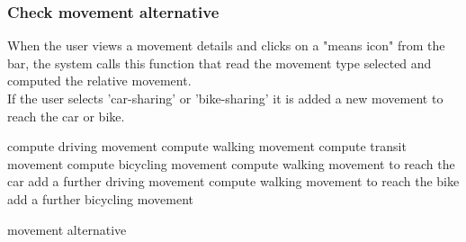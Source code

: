 \subsubsection{Check movement alternative}
When the user views a movement details and clicks on a "means icon" from the bar, the system calls this function that read the movement type selected and computed the relative movement.	
\\ If the user selects 'car-sharing' or 'bike-sharing' it is added a new movement to reach the car or bike.

\begin{algorithmic}
			\State compute driving movement
			\State compute walking movement
			\State compute transit movement
			\State compute bicycling movement
			\State compute walking movement to reach the car
			\State add a further driving movement
			\State compute walking movement to reach the bike
			\State add a further bicycling movement
		\EndIf
	
			\State \Return movement alternative
		\EndIf
	\EndFunction

\end{algorithmic}

